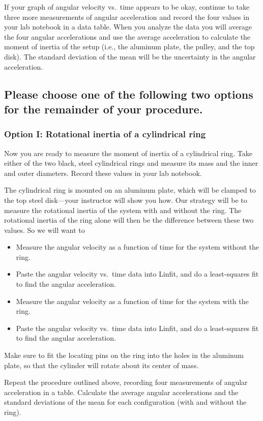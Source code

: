If your graph of angular velocity vs.\ time appears to be okay, continue to take three
more measurements of angular acceleration and record the four values in your
lab notebook in a data table.  When you analyze the data you will average the
four angular accelerations and use the average acceleration to
calculate the moment of
inertia of the setup (i.e., the aluminum plate, the pulley, and the
top disk).  The standard deviation of the mean will be the uncertainty
in the angular acceleration.

\subsection*{Please choose one of the following two options for the
remainder of your procedure.}

\subsubsection*{Option I:  Rotational inertia of a cylindrical ring}
Now you are ready to measure the moment of inertia of a cylindrical
ring. Take either of
the two black, steel cylindrical rings and measure its mass and the
inner and outer diameters. Record these values in your
lab notebook.

The cylindrical ring is mounted on an aluminum plate, which will be
clamped to the top steel disk---your instructor will show you how.
Our strategy will be to measure
the rotational inertia of the system with and without the ring.  The
rotational inertia of the ring alone will then be the difference
between these two values.  So we will want to
%
\begin{itemize}
\item Measure
       the angular velocity as a function of time for the system
without the ring.
%
\item Paste the angular velocity vs.\ time data into Linfit, and do a
least-squares fit to find the angular acceleration.
%
\item Measure the angular velocity as a function of time for
the system with the ring.
%
\item Paste the angular velocity vs.\ time data into Linfit, and do a
least-squares fit to find the angular acceleration.
\end{itemize}
%
Make sure to fit the locating pins on the ring into the holes
in the aluminum plate, so that the cylinder will rotate about its
center of mass.

Repeat the procedure outlined above, recording
four measurements of angular acceleration in a table. Calculate the
average angular accelerations and the standard deviations of the mean
for each configuration (with and without the ring).


